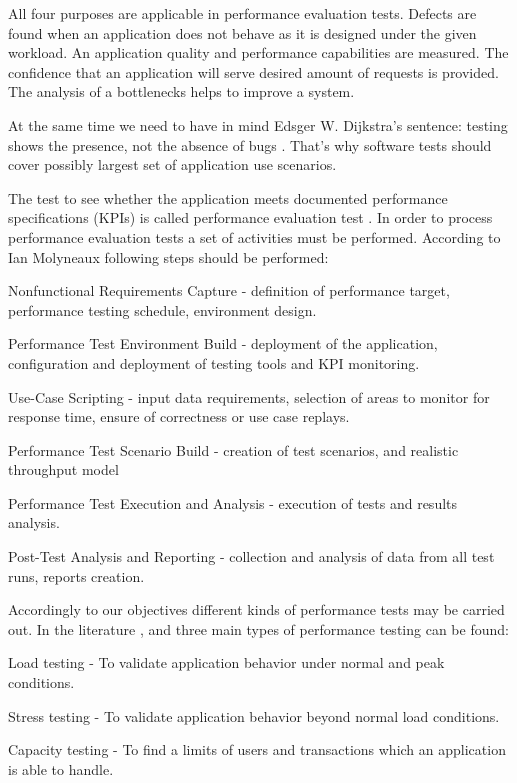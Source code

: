 \documentclass[12pt,a4paper]{article}
\let\tempone\itemize
\let\temptwo\enditemize
\renewenvironment{itemize}{\tempone\addtolength{\itemsep}{-0.4\baselineskip}}{\temptwo}
\begin{document}
All four purposes are applicable in performance evaluation tests. Defects are found when an application does not behave as it is designed under the given workload. An application quality and performance capabilities are measured. The confidence that an application will serve desired amount of requests is provided. The analysis of a bottlenecks helps to improve a system. 

At the same time we need to have in mind Edsger W. Dijkstra's sentence:
testing shows the presence, not the absence of bugs \cite{set}. That's why  software tests should cover possibly largest set of application use scenarios.  

The test to see whether the application meets documented performance specifications (KPIs) is called performance evaluation test \cite{arttest}. 
In order to process performance evaluation tests a set of activities must be performed. According to Ian Molyneaux \cite{artperformance} following steps should be performed:
\begin{itemize}
\item Nonfunctional Requirements Capture - definition of performance target, performance testing schedule, environment design.
\item Performance Test Environment Build - deployment of the application, configuration and deployment of testing tools and KPI monitoring.
\item Use-Case Scripting - input data requirements, selection of areas to monitor for response time, ensure of correctness or use case replays.
\item Performance Test Scenario Build - creation of test scenarios, and realistic throughput model
\item Performance Test Execution and Analysis - execution of tests and results analysis.
\item Post-Test Analysis and Reporting - collection and analysis of  data from all test runs, reports creation.
\end{itemize}

Accordingly to our objectives different kinds of performance tests may be carried out. In the literature \cite{artperformance},\cite{architectingperformance} and \cite{analysisofpet} three main types of performance testing can be found:
\begin{itemize}
 \item Load testing - To validate application behavior under normal and peak conditions.
 \item Stress testing - To validate application behavior beyond normal load conditions.
 \item Capacity testing - To find a limits of users and transactions which an application is able to handle.
\end{itemize}
\end{document}
